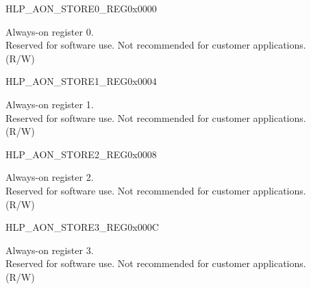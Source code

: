 \begin{register}{H}{LP\_AON\_STORE0\_REG}{0x0000}\label{regdesc:LPAONSTORE0REG}
%
\regnewline%
\begin{regdesc}\begin{reglist}
\label{fielddesc:LPAONLPAONSTORE0}\item [LP\_AON\_LP\_AON\_STORE0] Always-on register 0.\\
Reserved for software use. Not recommended for customer applications.\\
(R/W)
\end{reglist}\end{regdesc}
\end{register}

\begin{register}{H}{LP\_AON\_STORE1\_REG}{0x0004}\label{regdesc:LPAONSTORE1REG}
%
\regnewline%
\begin{regdesc}\begin{reglist}
\label{fielddesc:LPAONLPAONSTORE1}\item [LP\_AON\_LP\_AON\_STORE1] Always-on register 1.\\
Reserved for software use. Not recommended for customer applications.\\
(R/W)
\end{reglist}\end{regdesc}
\end{register}

\begin{register}{H}{LP\_AON\_STORE2\_REG}{0x0008}\label{regdesc:LPAONSTORE2REG}
%
\regnewline%
\begin{regdesc}\begin{reglist}
\label{fielddesc:LPAONLPAONSTORE2}\item [LP\_AON\_LP\_AON\_STORE2] Always-on register 2.\\
Reserved for software use. Not recommended for customer applications.\\
(R/W)
\end{reglist}\end{regdesc}
\end{register}

\begin{register}{H}{LP\_AON\_STORE3\_REG}{0x000C}\label{regdesc:LPAONSTORE3REG}
%
\regnewline%
\begin{regdesc}\begin{reglist}
\label{fielddesc:LPAONLPAONSTORE3}\item [LP\_AON\_LP\_AON\_STORE3] Always-on register 3.\\
Reserved for software use. Not recommended for customer applications.\\
(R/W)
\end{reglist}\end{regdesc}
\end{register}


